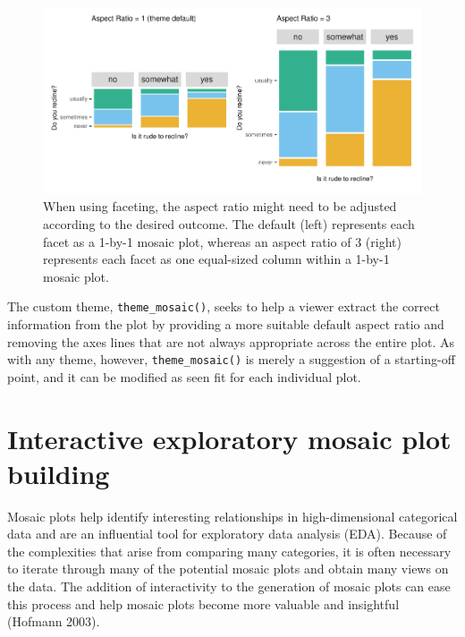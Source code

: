 \begin{figure}

{\centering \includegraphics[width=1\linewidth]{RJ-2023-013_files/figure-latex/aspect-1} 

}

\caption{When using faceting, the aspect ratio might need to be adjusted according to the desired outcome. The default (left) represents each facet as a 1-by-1 mosaic plot, whereas an aspect ratio of 3 (right) represents each facet as one equal-sized column within a 1-by-1 mosaic plot.}\label{fig:aspect}
\end{figure}

The custom theme, \texttt{theme\_mosaic()}, seeks to help a viewer extract the correct information from the plot by providing a more suitable default aspect ratio and removing the axes lines that are not always appropriate across the entire plot. As with any theme, however, \texttt{theme\_mosaic()} is merely a suggestion of a starting-off point, and it can be modified as seen fit for each individual plot.

\hypertarget{interactive-exploratory-mosaic-plot-building}{%
\section{Interactive exploratory mosaic plot building}\label{interactive-exploratory-mosaic-plot-building}}

Mosaic plots help identify interesting relationships in high-dimensional categorical data and are an influential tool for exploratory data analysis (EDA). Because of the complexities that arise from comparing many categories, it is often necessary to iterate through many of the potential mosaic plots and obtain many views on the data. The addition of interactivity to the generation of mosaic plots can ease this process and help mosaic plots become more valuable and insightful (Hofmann 2003).

